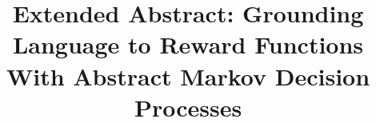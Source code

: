 \documentclass[conference]{IEEEtran}
\begin{document}
\title{Extended Abstract: Grounding Language to Reward Functions With Abstract Markov Decision Processes}

\author{%
\and
{}
\and
{}
\and
{}
\and
{}
}





%
\end{document}
